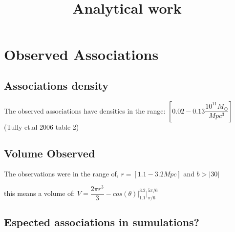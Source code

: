 \documentclass[12pt]{article}
\title{\begin{LARGE}
{Analytical work}
\end{LARGE}}
\begin{document}
\maketitle

\section{Observed Associations}

\subsection{Associations density}

The observed associations have densities in the range: $[0.02-0.13 \dfrac{10^{11}M_{\odot}}{Mpc^3}]$
(Tully et.al 2006 table 2)

\subsection{Volume Observed}

The observations were in the range of, $r = [1.1-3.2 Mpc]$ and $b > |30|$

this means a volume of: $V = \dfrac{2\pi r^3}{3}-cos(\theta) \bigg|_{1.1}^{3.2} \bigg|_{\pi/6}^{5\pi/6} $ 

\subsection{Espected associations in sumulations?}
\end{document}
